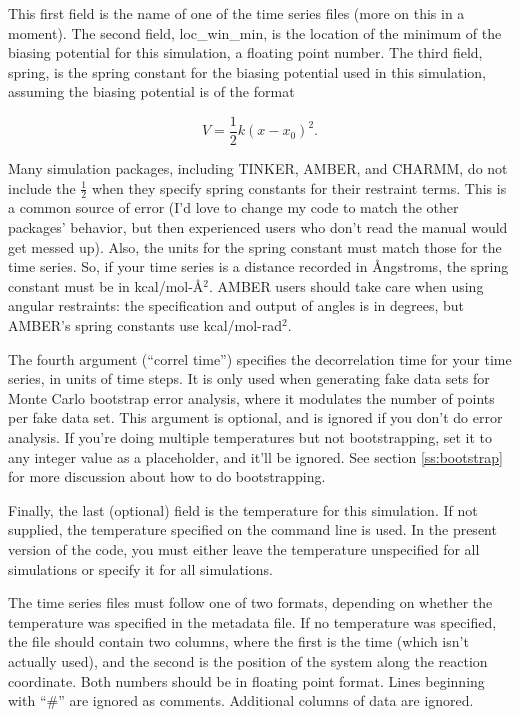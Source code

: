 \documentclass[12pt]{article}
\begin{document}
This first field is the name of one of the time series files (more on this
in a moment).  The second field, loc\_win\_min, is the location of the
minimum of the biasing potential for this simulation, a floating point
number.  The third field, spring, is the spring constant for the biasing
potential used in this simulation, assuming the biasing potential is of the
format 

\begin{equation}
V = \frac{1}{2} k (x-x_0)^2.  
\end{equation}

Many simulation packages, including TINKER, AMBER, and CHARMM, do not include
the $\frac{1}{2}$ when they specify spring constants for their restraint
terms.  This is a common source of error (I'd love to change my code to match
the other packages' behavior, but then experienced users who don't read the
manual would get messed up).  Also, the units for the spring constant must
match those for the time series.  So, if your time series is a distance
recorded in {\AA}ngstroms, the spring constant must be in kcal/mol-{\AA}$^2$.
AMBER users should take care when using angular restraints: the specification
and output of angles is in degrees, but AMBER's spring constants use
kcal/mol-rad$^2$.

The fourth argument (``correl time'') specifies the decorrelation time for
your time series, in units of time steps.  It is only used when generating
fake data sets for Monte Carlo bootstrap error analysis, where it modulates
the number of points per fake data set.  This argument is optional, and is
ignored if you don't do error analysis.  If you're doing multiple
temperatures but not bootstrapping, set it to any integer value as a
placeholder, and it'll be ignored.  See section \ref{ss:bootstrap} for more
discussion about how to do bootstrapping.

Finally, the last (optional) field is the temperature for this simulation.  If
not supplied, the temperature specified on the command line is used.  In
the present version of the code, you must either leave the temperature
unspecified for all simulations or specify it for all simulations.  

The time series files must follow one of two formats, depending on whether
the temperature was specified in the metadata file.  If no temperature was
specified, the file should contain two columns, where the first is the time
(which isn't actually used), and the second is the position of the system
along the reaction coordinate.  Both numbers should be in floating point
format.  Lines beginning with ``\#'' are ignored as comments.  Additional
columns of data are ignored.
\end{document}

